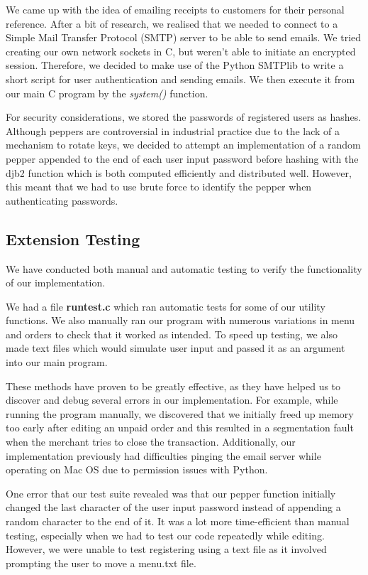 \documentclass[11pt]{article}
\begin{document}
We came up with the idea of emailing receipts to customers for their personal reference. After a bit of research, we realised that we needed to connect to a Simple Mail Transfer Protocol (SMTP) server to be able to send emails. We tried creating our own network sockets in C, but weren’t able to initiate an encrypted session. Therefore, we decided to make use of the Python SMTPlib to write a short script for user authentication and sending emails. We then execute it from our main C program by the \emph{system()} function. 

For security considerations, we stored the passwords of registered users as hashes. Although peppers \cite{pepperStat} are controversial in industrial practice due to the lack of a mechanism to rotate keys, we decided to attempt an implementation of a random pepper appended to the end of each user input password before hashing with the djb2 function which is both computed efficiently and distributed well. However, this meant that we had to use brute force to identify the pepper when authenticating passwords. 


\subsection{Extension Testing}

We have conducted both manual and automatic testing to verify the functionality of our implementation.

We had a file {\textbf{runtest.c}} which ran automatic tests for some of our utility functions. We also manually ran our program with numerous variations in menu and orders to check that it worked as intended. To speed up testing, we also made text files which would simulate user input and passed it as an argument into our main program.

These methods have proven to be greatly effective, as they have helped us to discover and debug several errors in our implementation. 
For example, while running the program manually, we discovered that we initially freed up memory too early after editing an unpaid order and this resulted in a segmentation fault when the merchant tries to close the transaction. Additionally, our implementation previously had difficulties pinging the email server while operating on Mac OS due to permission issues with Python. 

One error that our test suite revealed was that our pepper function initially changed the last character of the user input password instead of appending a random character to the end of it. It was a lot more time-efficient than manual testing, especially when we had to test our code repeatedly while editing. However, we were unable to test registering using a text file as it involved prompting the user to move a menu.txt file. 
\end{document}
